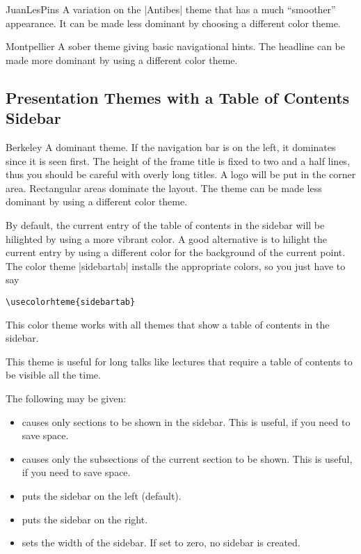 \begin{themeexample}{JuanLesPins}
  A variation on the |Antibes| theme that has a much ``smoother''
  appearance. It can be made less dominant by choosing a different
  color theme.
\end{themeexample}


\begin{themeexample}{Montpellier}
  A sober theme giving basic navigational hints. The headline can be
  made more dominant by using a different color theme.
\end{themeexample}



\subsection{Presentation Themes with a Table of Contents Sidebar}

\begin{themeexample}{Berkeley}
  A dominant theme. If the navigation bar is on the left, it dominates
  since it is seen first. The height of the frame title is fixed to
  two and a half lines, thus you should be careful with overly long
  titles. A logo will be put in the corner area. Rectangular areas
  dominate the layout. The theme can be made less dominant by using a
  different color theme.

  By default, the current entry of the table of contents in the
  sidebar will be hilighted by using a more vibrant color. A good
  alternative is to hilight the current entry by using a different
  color for the background of the current point. The color theme
  |sidebartab| installs the appropriate colors, so you just have to
  say
\begin{verbatim}
\usecolorhteme{sidebartab}
\end{verbatim}
  This color theme works with all themes that show a table of contents
  in the sidebar.

  This theme is useful for long talks like lectures that require a
  table of contents to be visible all the time.

  The following  may be given:
  \begin{itemize}
  \item {} causes only sections to be
    shown in the sidebar. This is useful, if you need to save
    space.
  \item {} causes only the subsections
    of the current section to be shown. This is useful, if you need to
    save  space.      
  \item {} puts the sidebar on the left (default).
  \item {} puts the sidebar on the right.
  \item {} sets the width of the
    sidebar. If set to zero, no sidebar is created.
  \end{itemize}
\end{themeexample}

